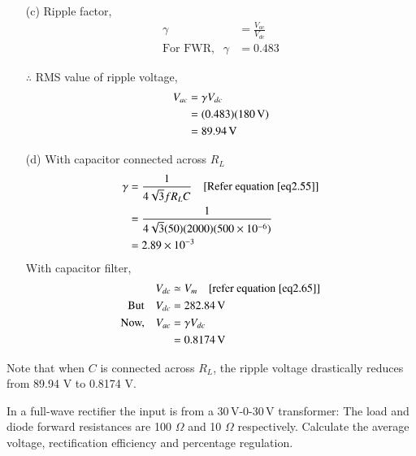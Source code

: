 \begin{solution}
\begin{itemize}
\item[(c)] Ripple factor,
\begin{align*}
\gamma & = \frac{V_{ac}}{V_{dc}}\\
\text{For FWR, } ~~ \gamma & = 0.483
\end{align*}

$\therefore$ RMS value of ripple voltage,
\begin{align*}
V_{ac} & = \gamma V_{dc}\\
& = (0.483) (180 \operatorname{\mathrm{V}})\\
& = 89.94 \operatorname{\mathrm{V}}
\end{align*}

\item[(d)] With capacitor connected across $R_L$
\begin{align*}
\gamma & = \frac{1}{4\sqrt{3} f R_L C} \quad [\text{Refer equation \eqref{eq2.55}}]\\
& = \frac{1}{4\sqrt{3} (50) (2000) (500 \times 10^{-6})}\\
& = 2.89 \times 10^{-3}
\end{align*}
With capacitor filter,
\begin{align*}
V_{dc} & \simeq V_m \quad \text{[refer equation \eqref{eq2.65}]}\\
\text{But }  ~~~ V_{dc} & = 282.84 \operatorname{\mathrm{V}}\\
\text{Now, } ~~~ V_{ac}& = \gamma V_{dc} \\
& = 0.8174 \operatorname{\mathrm{V}}
\end{align*}
\end{itemize}
Note that when $C$ is connected across $R_L$, the ripple voltage
drastically reduces from 89.94 V to 0.8174 V.
\end{solution}

\begin{example}\label{exam2.9}
In a full-wave rectifier the input is from a 30\,V-0-30\,V transformer:
The load and diode forward resistances are 100 $\Omega$ and 10
$\Omega$ respectively. Calculate the average voltage, rectification
efficiency and percentage regulation.
\end{example}

